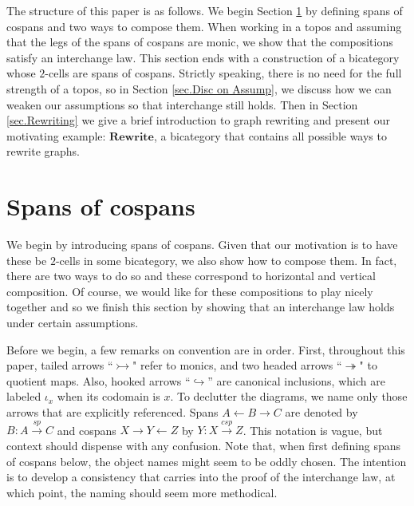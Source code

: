 \documentclass{tac}
\newcommand{\cat}[1]{\mathbf{#1}}
\newcommand{\from}{\colon}
\renewcommand{\span}{\xrightarrow{\mathit{sp}}}
\newcommand{\cospan}{\xrightarrow{\mathit{csp}}}
\begin{document}
The structure of this paper is as follows. 
We begin Section \ref{sec.SpansOfCospans} by 
defining spans of cospans and two ways to compose them.
When working in a topos and assuming that
the legs of the spans of cospans are monic, 
we show that the compositions satisfy an interchange law.  
This section ends with a construction of a bicategory 
whose $2$-cells are spans of cospans. 
Strictly speaking, there is no need for the full strength 
of a topos, so in Section \ref{sec.Disc on Assump}, 
we discuss how we can weaken our assumptions 
so that interchange still holds.  
Then in Section \ref{sec.Rewriting} we give a 
brief introduction to graph rewriting and 
present our motivating example: 
$\cat{ Rewrite }$, a bicategory that contains 
all possible ways to rewrite graphs.


\section{Spans of cospans} 
\label{sec.SpansOfCospans}

We begin by introducing spans of cospans.  
Given that our motivation is to have these be 
$2$-cells in some bicategory, 
we also show how to compose them.  
In fact, there are two ways to do so and 
these correspond to horizontal and vertical composition. 
Of course, we would like for these compositions to 
play nicely together and so we finish this section by 
showing that an interchange law holds 
under certain assumptions. 

Before we begin, a few remarks on convention are in order.
First, throughout this paper, 
tailed arrows ``$\rightarrowtail$" refer to monics, and 
two headed arrows ``$\twoheadrightarrow$" to 
quotient maps. Also, hooked arrows ``$\hookrightarrow$'' 
are canonical inclusions, which are labeled $\iota_x$ 
when its codomain is $x$. To declutter the diagrams, 
we name only those arrows that are explicitly referenced. 
Spans 
	$ A \leftarrow B \to C $
are denoted by 
	$ B \from A \span C $ 
and cospans 
	$ X \to Y \leftarrow Z $ 
by 
	$ Y \from X \cospan Z $. 
This notation is vague, but context should dispense 
with any confusion. Note that, when first defining 
spans of cospans below, the object names might seem 
to be oddly chosen. The intention is to develop a consistency
that carries into the proof of the interchange law, 
at which point, the naming should seem more methodical.

\end{document}
